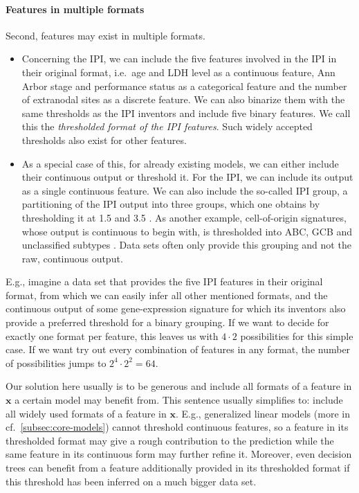 \paragraph{Features in multiple formats}
Second, features may exist in multiple formats.
\begin{itemize}
    \item Concerning the IPI, we can include the five features involved in the IPI in their original
        format, i.e.\ age and LDH level as a continuous feature, Ann Arbor stage and performance 
        status as a categorical feature and the number of extranodal sites as a discrete feature.
        We can also binarize them with the same thresholds as the IPI inventors and include five 
        binary features. We call this the \textit{thresholded format of the IPI features}. 
        Such widely accepted thresholds also exist for other features.
    \item As a special case of this, for already existing models, we can either include their continuous 
        output or threshold it. For the IPI, we can include its output as a single continuous feature. We can also 
        include the so-called IPI group, a partitioning of the IPI output into three groups, which 
        one obtains by thresholding it at \num{1.5} and \num{3.5} \cite{ipi93}. As another example, 
        cell-of-origin signatures, whose output is continuous to begin with, is thresholded into 
        ABC, GCB and unclassified subtypes \cite{abc-gcb00}. Data sets often only provide this 
        grouping and not the raw, continuous output. 
\end{itemize}

E.g., imagine a data set that provides the five IPI features in their original format, from which we can 
easily infer all other mentioned formats, and the continuous output of some gene-expression 
signature for which its inventors also provide a preferred threshold for a binary grouping. 
If we want to decide for 
exactly one format per feature, this leaves us with $4 \cdot 2$ possibilities for this simple case. 
If we want try out every combination of features in any format, the number of possibilities jumps to 
$2^4 \cdot 2^2 = 64$. 

Our solution here usually is to be generous and include all formats of a feature in $\mathbf{x}$ a 
certain model may benefit from. This sentence usually 
simplifies to: include all widely used formats of a feature in $\mathbf{x}$. E.g., generalized 
linear models (more in cf.\ \ref{subsec:core-models}) cannot threshold continuous features, so a 
feature in its thresholded format may give 
a rough contribution to the prediction while the same feature in its continuous form may further 
refine it. Moreover, even decision trees can benefit from a feature additionally provided in its 
thresholded format if this threshold has been inferred on a much bigger data set.

